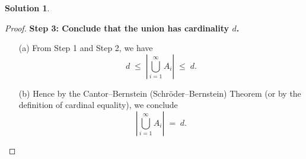 \documentclass[12pt]{article}
\theoremstyle{definition} %
\newtheorem{solution}{Solution}
\theoremstyle{plain} %
\begin{document}
\begin{solution}
\begin{proof}
        \vspace{0.3cm}
        \textbf{Step 3: Conclude that the union has cardinality $d$.}
        \begin{enumerate}
            \item[(a)] From Step 1 and Step 2, we have
            \[
               d
               \;\le\;
               \left|\bigcup_{i=1}^\infty A_i\right|
               \;\le\;
               d.
            \]
            \item[(b)] Hence by the Cantor--Bernstein (Schr\"oder--Bernstein) Theorem (or by the definition of cardinal equality), we conclude
            \[
               \left|\bigcup_{i=1}^\infty A_i\right| \;=\; d.
            \]
        \end{enumerate}
        
        \end{proof}
\end{solution}
\end{document}
